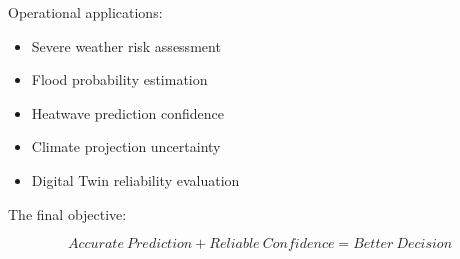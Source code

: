 Operational applications:


\begin{itemize}

\item Severe weather risk assessment

\item Flood probability estimation

\item Heatwave prediction confidence

\item Climate projection uncertainty

\item Digital Twin reliability evaluation

\end{itemize}



The final objective:


\[
Accurate\ Prediction
+
Reliable\ Confidence
=
Better\ Decision
\]
